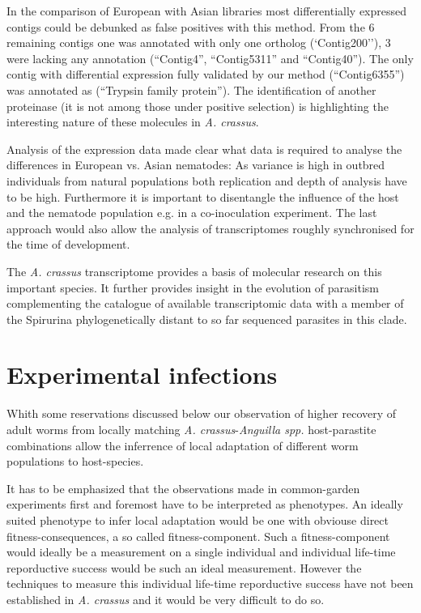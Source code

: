 In the comparison of European with Asian libraries most
differentially expressed contigs could be debunked as false positives
with this method. From the 6 remaining contigs one was annotated with
only one ortholog (`Contig200''), 3 were lacking any annotation
(``Contig4'', ``Contig5311'' and ``Contig40''). The only contig with
differential expression fully validated by our method (``Contig6355'')
was annotated as (``Trypsin family protein''). The identification of
another proteinase (it is not among those under positive selection) is
highlighting the interesting nature of these molecules in
\textit{A. crassus}.

Analysis of the expression data made clear what data is required to
analyse the differences in European vs. Asian nematodes: As variance
is high in outbred individuals from natural populations both
replication and depth of analysis have to be high. Furthermore it is
important to disentangle the influence of the host and the nematode
population e.g. in a co-inoculation experiment. The last approach
would also allow the analysis of transcriptomes roughly synchronised
for the time of development.

The \textit{A. crassus} transcriptome provides a basis of molecular
research on this important species. It further provides insight in
the evolution of parasitism complementing the catalogue of available
transcriptomic data with a member of the Spirurina phylogenetically
distant to so far sequenced parasites in this clade.


\section{Experimental infections}
\label{sec:exp-inf}

Whith some reservations discussed below our observation of higher
recovery of adult worms from locally matching
\textit{A. crassus}-\textit{Anguilla spp.} host-parastite combinations
allow the inferrence of local adaptation of different worm populations
to host-species.

It has to be emphasized that the observations made in common-garden
experiments first and foremost have to be interpreted as
phenotypes. An ideally suited phenotype to infer local adaptation
would be one with obviouse direct fitness-consequences, a so called
fitness-component. Such a fitness-component would ideally be a
measurement on a single individual and individual life-time
reporductive success would be such an ideal measurement. However the
techniques to measure this individual life-time reporductive success
have not been established in \textit{A. crassus} and it would be very
difficult to do so.

